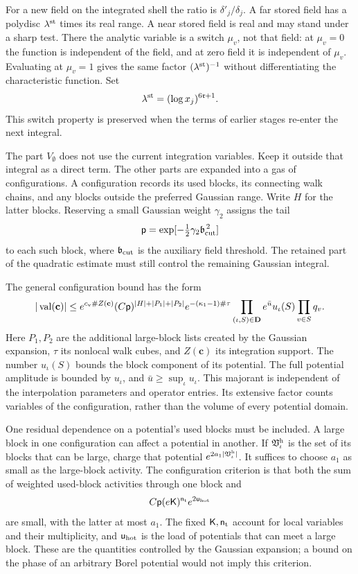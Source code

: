 \documentclass[11pt,letterpaper,reqno]{amsart}
\theoremstyle{definition}
\theoremstyle{remark}
\begin{document}
For a new field on the integrated shell the ratio is
\(\delta'_j/\delta_j\). A far stored field has a
polydisc \(\lambda^{\rm st}\) times its real range.
A near stored field is real and may stand under a sharp
test. There the analytic variable is a switch \(\mu_v\),
not that field: at \(\mu_v=0\) the function is independent
of the field, and at zero field it is independent of
\(\mu_v\). Evaluating at \(\mu_v=1\) gives the same
factor \((\lambda^{\rm st})^{-1}\) without differentiating
the characteristic function. Set
\begin{equation}\label{eq:xrg-stage-switch-size}
 \lambda^{\rm st}=(\log x_j)^{6\mathfrak r+1}.
\end{equation}
This switch property is preserved when the terms of
earlier stages re-enter the next integral.

The part \(V_\emptyset\) does not use the current
integration variables. Keep it outside that integral
as a direct term. The other parts are expanded into
a gas of configurations. A configuration records its
used blocks, its connecting walk chains, and any
blocks outside the preferred Gaussian range.
Write \(H\) for the latter blocks. Reserving a small
Gaussian weight \(\gamma_2\) assigns the tail
\[
 \mathsf p=
       \exp[-\tfrac12\gamma_2\mathfrak b_{\rm cut}^{\,2}]
\]
to each such block, where \(\mathfrak b_{\rm cut}\) is
the auxiliary field threshold. The retained part of
the quadratic estimate must still control the
remaining Gaussian integral.

The general configuration bound has the form
\[
 |\operatorname{val}(\mathbf c)|
 \le e^{c_{\rm v}\#Z(\mathbf c)}
       (C\mathsf p)^{|H|+|P_1|+|P_2|}
       e^{-(\kappa_1-1)\#\tau}
       \prod_{(\iota,S)\in\mathbf D}
                       e^{\bar u}u_\iota(S)\prod_{v\in S}q_v.
\]
Here \(P_1,P_2\) are the additional large-block lists
created by the Gaussian expansion, \(\tau\) its
nonlocal walk cubes, and \(Z(\mathbf c)\) its
integration support. The number \(u_\iota(S)\)
bounds the block component of its potential.
The full potential amplitude is bounded by \(u_\iota\),
and \(\bar u\ge\sup_\iota u_\iota\).
This majorant is independent of the interpolation
parameters and operator entries. Its extensive
factor counts variables of the configuration,
rather than the volume of every potential domain.

One residual dependence on a potential's used blocks
must be included. A large block in one configuration
can affect a potential in another. If
\(\mathfrak V_\iota^{\rm h}\) is the set of its
blocks that can be large, charge that potential
\(e^{2a_1|\mathfrak V_\iota^{\rm h}|}\).
It suffices to choose \(a_1\) as small as the
large-block activity. The configuration criterion
is that both the sum of weighted used-block
activities through one block and
\[
 C\mathsf p(e\mathsf K)^{\mathsf n_{\rm t}}
                                      e^{2\mathsf u_{\rm hot}}
\]
are small, with the latter at most \(a_1\).
The fixed \(\mathsf K,\mathsf n_{\rm t}\) account
for local variables and their multiplicity, and
\(\mathsf u_{\rm hot}\) is the load of potentials
that can meet a large block. These are the
quantities controlled by the Gaussian expansion;
a bound on the phase of an arbitrary Borel
potential would not imply this criterion.
\end{document}
